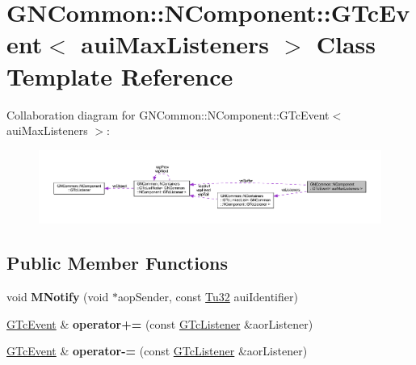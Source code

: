 \hypertarget{class_g_n_common_1_1_n_component_1_1_g_tc_event}{}\section{G\+N\+Common\+:\+:N\+Component\+:\+:G\+Tc\+Event$<$ aui\+Max\+Listeners $>$ Class Template Reference}
\label{class_g_n_common_1_1_n_component_1_1_g_tc_event}


Collaboration diagram for G\+N\+Common\+:\+:N\+Component\+:\+:G\+Tc\+Event$<$ aui\+Max\+Listeners $>$\+:
\nopagebreak
\begin{figure}[H]
\begin{center}
\leavevmode
\includegraphics[width=350pt]{class_g_n_common_1_1_n_component_1_1_g_tc_event__coll__graph}
\end{center}
\end{figure}
\subsection*{Public Member Functions}
\begin{DoxyCompactItemize}
\item 
\mbox{\label{class_g_n_common_1_1_n_component_1_1_g_tc_event_aa4b6f4ff1c4b91c55ac4c7350174bde8}} 
void {\bfseries M\+Notify} (void $\ast$aop\+Sender, const \mbox{\hyperlink{namespace_g_n_common_a941b527ef318f318aed7903dc832b7e4}{Tu32}} aui\+Identifier)
\item 
\mbox{\label{class_g_n_common_1_1_n_component_1_1_g_tc_event_adda36d639b1a0ddc31316559a1cddec9}} 
\mbox{\hyperlink{class_g_n_common_1_1_n_component_1_1_g_tc_event}{G\+Tc\+Event}} \& {\bfseries operator+=} (const \mbox{\hyperlink{class_g_n_common_1_1_n_component_1_1_g_tc_listener}{G\+Tc\+Listener}} \&aor\+Listener)
\item 
\mbox{\label{class_g_n_common_1_1_n_component_1_1_g_tc_event_a5ecf841886dd8741f88ed053bb7c50ab}} 
\mbox{\hyperlink{class_g_n_common_1_1_n_component_1_1_g_tc_event}{G\+Tc\+Event}} \& {\bfseries operator-\/=} (const \mbox{\hyperlink{class_g_n_common_1_1_n_component_1_1_g_tc_listener}{G\+Tc\+Listener}} \&aor\+Listener)
\end{DoxyCompactItemize}
